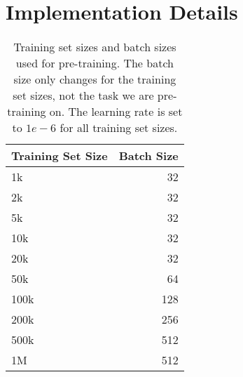 \section{Implementation Details}
\label{app:hyperparameters}


\begin{table}
\centering
\begin{tabular}{l r}
\toprule
Training Set Size & Batch Size \\
\midrule
1k & 32 \\
2k & 32 \\
5k & 32 \\
10k & 32 \\
20k & 32 \\
50k & 64 \\
100k & 128 \\
200k & 256 \\
500k & 512 \\
1M & 512 \\
\bottomrule
\end{tabular}
\caption{
    Training set sizes and batch sizes used for pre-training.
    The batch size only changes for the training set sizes, not the task we are pre-training on.
    The learning rate is set to $1e-6$ for all training set sizes.
    \label{tab:trainingsetsize}
}

\end{table}

